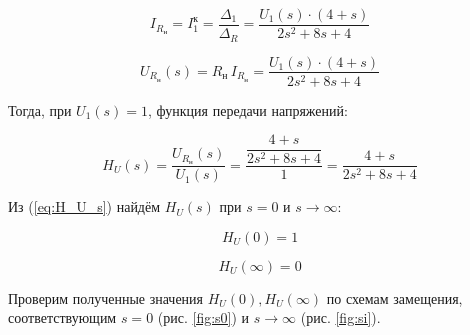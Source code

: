 $$ 
I_{R_н} = I^к_{1} = \dfrac{\Delta_1}{\Delta_R} = 
\dfrac{U_1(s) \cdot (4 + s)}{2s^2 + 8s + 4}
$$

\begin{equation}\label{eq:U_R_n}
U_{R_н}(s) = 
R_н \, I_{R_н} = 
\dfrac{U_1(s) \cdot (4 + s)}{2s^2 + 8s + 4}
\end{equation}

Тогда, при $ U_1(s) = 1 $, функция передачи напряжений:

\begin{equation}\label{eq:H_U_s}
H_U(s) = 
\dfrac{U_{R_н}(s)}{U_1(s)} =
\dfrac{\dfrac{4 + s}{2s^2 + 8s + 4}}{1} =
\dfrac{4 + s}{2s^2 + 8s + 4}
\end{equation}

Из (\ref{eq:H_U_s}) 
найдём $ H_U(s) $ 
при 
$ s = 0 $ и
$ s \rightarrow \infty $:

$$ H_U(0) = 1 $$

$$ H_U(\infty) = 0 $$

Проверим полученные значения 
$ H_U(0), H_U(\infty) $ по схемам замещения, 
соответствующим $ s = 0 $ 
(рис. \ref{fig:s0})
и
$ s \rightarrow \infty $ 
(рис. \ref{fig:si}). 

